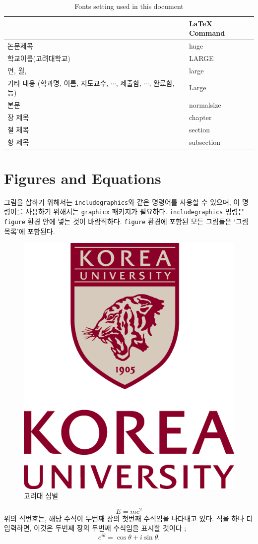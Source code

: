 \documentclass[11pt]{report}
\numberwithin{figure}{section}
\theoremstyle{plain}
\theoremstyle{definition}
\theoremstyle{corollary}
\theoremstyle{definition}
\theoremstyle{plain}
\theoremstyle{definition}
\theoremstyle{plain}
\begin{document}

\begin{table}\centering
\caption{Fonts setting used in this document}
\vspace{0.5cm}
\begin{tabular}{  m{7cm}  m{5cm} }
\hline 				&     \LaTeX{} Command \\\hline 
논문제목				& huge \\
학교이름(고려대학교)	& LARGE \\
연, 월, 				& large\\
기타 내용 (학과명, 이름, 지도교수, \(\cdots\), 제출함, \(\cdots\), 완료함,등)	& Large\\
본문					& normalsize	\\
장 제목   			& chapter \\
절 제목				& section \\
항 제목				& subsection \\\hline

\end{tabular}
\end{table}



\newpage
\section{Figures and Equations}\label{sec:figures_and_equations}

그림을 삽하기 위해서는 \texttt{includegraphics}와 같은 명령어를 사용할 수 있으며, 이 명령어를 사용하기 위해서는 \texttt{graphicx} 패키지가 필요하다.
\texttt{includegraphics} 명령은 \texttt{figure} 환경 안에 넣는 것이 바람직하다.
\texttt{figure} 환경에 포함된 모든 그림들은 `그림 목록'에 포함된다.

\renewcommand\figurename{그림}
\begin{figure}
\begin{center}
\includegraphics[width=.2\textwidth]{kumark.png}
\end{center}
\caption{고려대 심벌}
\end{figure}

\begin{equation}
E=mc^2
\end{equation}
위의 식번호는, 해당 수식이 두번째 장의 첫번째 수식임을 나타내고 있다.
식을 하나 더 입력하면, 이것은 두번째 장의 두번째 수식임을 표시할 것이다 ;
\begin{equation}
e^{i\theta}=\cos\theta+i\sin\theta.
\end{equation}
\end{document}
